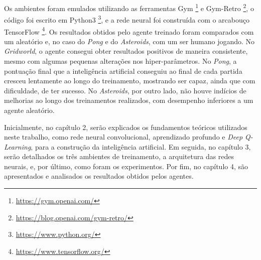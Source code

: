 Os ambientes foram emulados utilizando as ferramentas Gym \footnote{\url{https://gym.openai.com/}} e Gym-Retro \footnote{\url{https://blog.openai.com/gym-retro/}}, o código foi escrito em Python3 \footnote{\url{https://www.python.org/}}, e a rede neural foi construída com o arcabouço TensorFlow \footnote{\url{https://www.tensorflow.org/}}.
Os resultados obtidos pelo agente treinado foram comparados com um aleatório e, no caso do \textit{Pong} e do \textit{Asteroids}, com um ser humano jogando.
No \textit{Gridworld}, o agente consegui obter resultados positivos de maneira consistente, mesmo com algumas pequenas alterações nos hiper-parâmetros.
No \textit{Pong}, a pontuação final que a inteligência artificial conseguiu ao final de cada partida cresceu lentamente ao longo do treinamento, mostrando ser capaz, ainda que com dificuldade, de ter sucesso.
No \textit{Asteroids}, por outro lado, não houve indícios de melhorias ao longo dos treinamentos realizados, com desempenho inferiores a um agente aleatório.

Inicialmente, no capítulo 2, serão explicados os fundamentos teóricos utilizados neste trabalho, como rede neural convolucional, aprendizado profundo e \textit{Deep Q-Learning}, para a construção da inteligência artificial.
Em seguida, no capítulo 3, serão detalhados os três ambientes de treinamento, a arquitetura das redes neurais, e, por último, como foram os experimentos.
Por fim, no capítulo 4, são apresentados e analisados os resultados obtidos pelos agentes.

